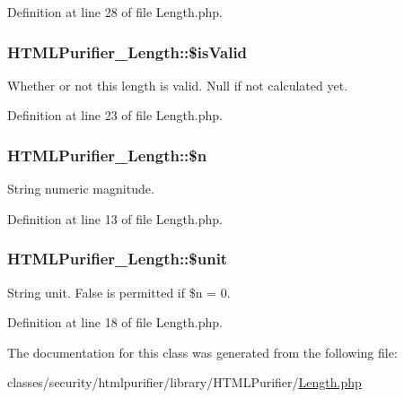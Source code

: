 Definition at line 28 of file Length.\+php.

\hypertarget{classHTMLPurifier__Length_a702c647145c9f859423b269f98fbe2e0}{
\subsubsection[{\$is\+Valid}]{\setlength{\rightskip}{0pt plus 5cm}H\+T\+M\+L\+Purifier\+\_\+\+Length\+::\$is\+Valid\hspace{0.3cm}{\ttfamily [protected]}}}\label{classHTMLPurifier__Length_a702c647145c9f859423b269f98fbe2e0}
Whether or not this length is valid. Null if not calculated yet. 

Definition at line 23 of file Length.\+php.

\hypertarget{classHTMLPurifier__Length_ae5e0e6ba1ea8bf13163fd1926c583e43}{
\subsubsection[{\$n}]{\setlength{\rightskip}{0pt plus 5cm}H\+T\+M\+L\+Purifier\+\_\+\+Length\+::\$n\hspace{0.3cm}{\ttfamily [protected]}}}\label{classHTMLPurifier__Length_ae5e0e6ba1ea8bf13163fd1926c583e43}
String numeric magnitude. 

Definition at line 13 of file Length.\+php.

\hypertarget{classHTMLPurifier__Length_a770d1e622fc661387ade708fa9308a89}{
\subsubsection[{\$unit}]{\setlength{\rightskip}{0pt plus 5cm}H\+T\+M\+L\+Purifier\+\_\+\+Length\+::\$unit\hspace{0.3cm}{\ttfamily [protected]}}}\label{classHTMLPurifier__Length_a770d1e622fc661387ade708fa9308a89}
String unit. False is permitted if \$n = 0. 

Definition at line 18 of file Length.\+php.



The documentation for this class was generated from the following file\+:\begin{DoxyCompactItemize}
\item 
classes/security/htmlpurifier/library/\+H\+T\+M\+L\+Purifier/\hyperlink{Length_8php}{Length.\+php}\end{DoxyCompactItemize}
